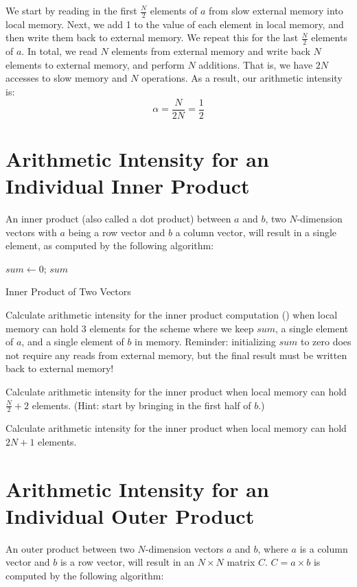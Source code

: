 \documentclass[a4 paper]{article}
\begin{document}
We start by reading in the first $\frac{N}{2}$ elements of $a$ from slow external memory into local memory.
Next, we add 1 to the value of each element in local memory, and then write them back to external memory.
We repeat this for the last $\frac{N}{2}$ elements of $a$.
In total, we read $N$ elements from external memory and write back $N$ elements to external memory, and perform $N$ additions.
That is, we have $2N$ accesses to slow memory and $N$ operations.
As a result, our arithmetic intensity is:
\[
\alpha = \frac{N}{2N} = \frac{1}{2}
\]

\noindent

\newpage
\section{Arithmetic Intensity for an Individual Inner Product}
\label{sec:ip_ai}
An inner product (also called a dot product) between $a$ and $b$, two $N$-dimension vectors  with $a$ being a row vector and $b$ a column vector, will result in a single element, as computed by the following algorithm:

\begin{algorithm}
\SetAlgoLined
\SetInd{0.25em}{0.5em}
$sum \longleftarrow 0$;
\Return $sum$
\caption{Inner Product of Two Vectors}
\label{algo:inner-product}
\end{algorithm}

Calculate arithmetic intensity for the inner product computation () when local memory can hold 3 elements for the scheme where we keep $sum$, a single element of $a$, and a single element of $b$ in memory.
Reminder: initializing $sum$ to zero does not require any reads from external memory, but the final result must be written back to external memory!

\solution{}

Calculate arithmetic intensity for the inner product when local memory can hold $\frac{N}{2} + 2$ elements.
(Hint: start by bringing in the first half of $b$.)


\solution{}

Calculate arithmetic intensity for the inner product when local memory can hold $2N + 1$ elements.

\solution{}

\newpage
\section{Arithmetic Intensity for an Individual Outer Product}
\label{sec:op_ai}
An outer product between two $N$-dimension vectors $a$ and $b$, where $a$ is a column vector and $b$ is a row vector, will result in an $N \times N$ matrix $C$.
$C = a \times b$ is computed by the following algorithm:
\end{document}
